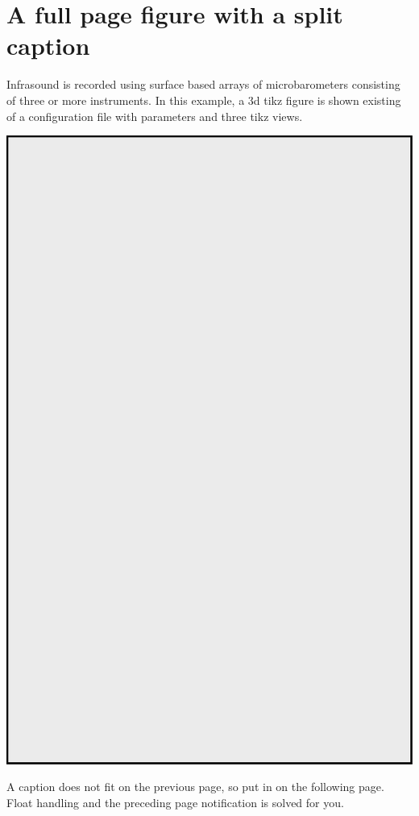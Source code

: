 \section{A full page figure with a split caption }\label{sec:another:example2}

Infrasound is recorded using surface based arrays of microbarometers consisting of three or more instruments.
In this example, a 3d tikz figure is shown existing of a configuration file with parameters and three tikz views.

\begin{FPfigure}
\begin{center}
\includegraphics[height=\textheight]{ch-another/sec-example2/figs/example}
\caption{A caption does not fit on the previous page, so put in on the following page. Float handling and the preceding page notification is solved for you.
}
\label{fig:another:fpfigure}
\end{center}
\end{FPfigure}